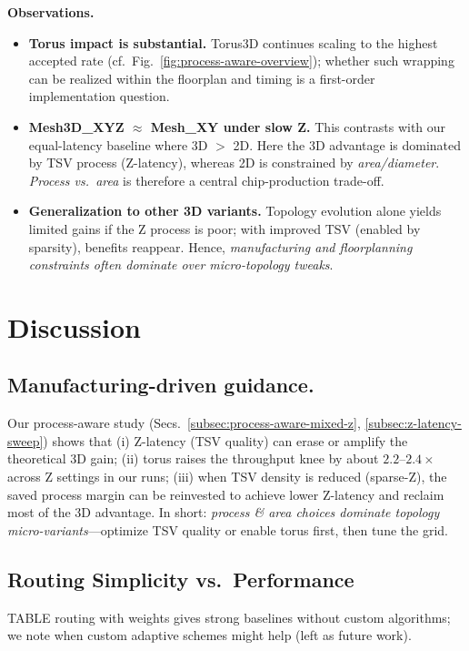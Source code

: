 \documentclass[11pt]{article}
\begin{document}
\noindent\textbf{Observations.}
\begin{itemize}[leftmargin=1.2em]
  \item \textbf{Torus impact is substantial.} Torus3D continues scaling to the highest accepted rate
        (cf.\ Fig.~\ref{fig:process-aware-overview}); whether such wrapping can be realized within the
        floorplan and timing is a first-order implementation question.
  \item \textbf{Mesh3D\_XYZ $\approx$ Mesh\_XY under slow Z.} This contrasts with our equal-latency baseline
        where 3D $>$ 2D. Here the 3D advantage is dominated by TSV process (Z-latency), whereas 2D is constrained
        by \emph{area/diameter}. \textit{Process vs.\ area} is therefore a central chip-production trade-off.
  \item \textbf{Generalization to other 3D variants.} Topology evolution alone yields limited gains if the Z process
        is poor; with improved TSV (enabled by sparsity), benefits reappear. Hence, \emph{manufacturing and
        floorplanning constraints often dominate over micro-topology tweaks}.
\end{itemize}


\section{Discussion}
\subsection{Manufacturing-driven guidance.}
Our process-aware study (Secs.~\ref{subsec:process-aware-mixed-z}, \ref{subsec:z-latency-sweep})
shows that (i) Z-latency (TSV quality) can erase or amplify the theoretical 3D gain;
(ii) torus raises the throughput knee by about $2.2$--$2.4\times$ across Z settings in our runs;
(iii) when TSV density is reduced (sparse-Z), the saved process margin can be reinvested to
achieve lower Z-latency and reclaim most of the 3D advantage. In short: \emph{process \& area
choices dominate topology micro-variants}—optimize TSV quality or enable torus first, then tune the grid.


\subsection{Routing Simplicity vs.\ Performance}
TABLE routing with weights gives strong baselines without custom algorithms; we note when custom adaptive schemes might help (left as future work).
\end{document}
